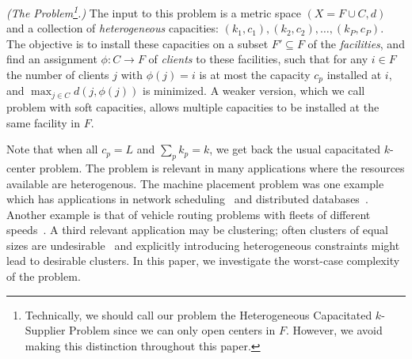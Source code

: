 \begin{definition}\emph{(The \mckc Problem\footnote{Technically, we should call our problem the Heterogeneous Capacitated $k$-Supplier Problem since we can only open centers in $F$. However, we avoid making this distinction throughout this paper.}.)}
	The input to this problem is a metric space $(X = F\cup C,d)$  %
	and  a collection of {\em heterogeneous} capacities: $(k_1,c_1), (k_2,c_2),\ldots, (k_P,c_P)$.
	The objective is to install these capacities on a subset $F'\subseteq F$ of the {\em facilities}, and find an assignment $\phi:C\to F$ of {\em clients} to these facilities,
	such that for any $i\in F$ the number of clients $j$ with $\phi(j) = i$ is at most the capacity $c_p$ installed at $i$, and $\max_{j\in C} d(j,\phi(j))$ is minimized.
	A weaker version, which we call \mckc problem with soft capacities, allows multiple capacities to be installed at the same facility in $F$.
\end{definition}
\noindent
Note that when all $c_p = L$ and $\sum_p k_p = k$, we get back the usual capacitated $k$-center problem.
The \mckc problem is relevant in many applications where the resources available are heterogenous. The machine placement problem was one example which has applications in network scheduling~\cite{QiuSZ15, ImM15a} and distributed databases~\cite{MorganL77,SKRN15}. Another example is that of  vehicle routing problems with  fleets of different speeds~\cite{GortzMN016}. A third relevant application may be clustering; often clusters of equal sizes are undesirable~\cite{GuhaRS01} and explicitly introducing heterogeneous constraints might lead to desirable clusters.
In this paper, we investigate the worst-case complexity of the \mckc problem. %

